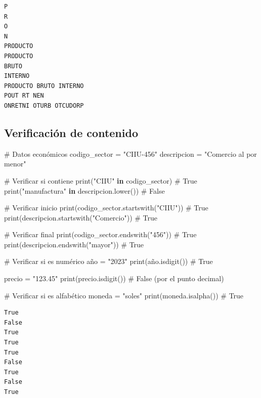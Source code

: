 \documentclass[
  doc,
  floatsintext,
  longtable,
  a4paper,
  nolmodern,
  notxfonts,
  notimes,
  12pt,
  colorlinks=true,linkcolor=blue,citecolor=blue,urlcolor=blue]{apa7}
\newenvironment{Shaded}{\begin{snugshade}}{\end{snugshade}}
\newcommand{\BuiltInTok}[1]{\textcolor[rgb]{0.00,0.23,0.31}{#1}}
\newcommand{\CommentTok}[1]{\textcolor[rgb]{0.37,0.37,0.37}{#1}}
\newcommand{\KeywordTok}[1]{\textcolor[rgb]{0.00,0.23,0.31}{\textbf{#1}}}
\newcommand{\NormalTok}[1]{\textcolor[rgb]{0.00,0.23,0.31}{#1}}
\newcommand{\OperatorTok}[1]{\textcolor[rgb]{0.37,0.37,0.37}{#1}}
\newcommand{\StringTok}[1]{\textcolor[rgb]{0.13,0.47,0.30}{#1}}
\begin{document}
\begin{verbatim}
P
R
O
N
PRODUCTO
PRODUCTO
BRUTO
INTERNO
PRODUCTO BRUTO INTERNO
POUT RT NEN
ONRETNI OTURB OTCUDORP
\end{verbatim}

\subsection{Verificación de
contenido}\label{verificaciuxf3n-de-contenido}

\begin{Shaded}
\begin{Highlighting}[]
\CommentTok{\# Datos económicos}
\NormalTok{codigo\_sector }\OperatorTok{=} \StringTok{"CIIU{-}456"}
\NormalTok{descripcion }\OperatorTok{=} \StringTok{"Comercio al por menor"}

\CommentTok{\# Verificar si contiene}
\BuiltInTok{print}\NormalTok{(}\StringTok{"CIIU"} \KeywordTok{in}\NormalTok{ codigo\_sector)  }\CommentTok{\# True}
\BuiltInTok{print}\NormalTok{(}\StringTok{"manufactura"} \KeywordTok{in}\NormalTok{ descripcion.lower())  }\CommentTok{\# False}

\CommentTok{\# Verificar inicio}
\BuiltInTok{print}\NormalTok{(codigo\_sector.startswith(}\StringTok{"CIIU"}\NormalTok{))  }\CommentTok{\# True}
\BuiltInTok{print}\NormalTok{(descripcion.startswith(}\StringTok{"Comercio"}\NormalTok{))  }\CommentTok{\# True}

\CommentTok{\# Verificar final}
\BuiltInTok{print}\NormalTok{(codigo\_sector.endswith(}\StringTok{"456"}\NormalTok{))  }\CommentTok{\# True}
\BuiltInTok{print}\NormalTok{(descripcion.endswith(}\StringTok{"mayor"}\NormalTok{))  }\CommentTok{\# True}

\CommentTok{\# Verificar si es numérico}
\NormalTok{año }\OperatorTok{=} \StringTok{"2023"}
\BuiltInTok{print}\NormalTok{(año.isdigit())  }\CommentTok{\# True}

\NormalTok{precio }\OperatorTok{=} \StringTok{"123.45"}
\BuiltInTok{print}\NormalTok{(precio.isdigit())  }\CommentTok{\# False (por el punto decimal)}

\CommentTok{\# Verificar si es alfabético}
\NormalTok{moneda }\OperatorTok{=} \StringTok{"soles"}
\BuiltInTok{print}\NormalTok{(moneda.isalpha())  }\CommentTok{\# True}
\end{Highlighting}
\end{Shaded}

\begin{verbatim}
True
False
True
True
True
False
True
False
True
\end{verbatim}
\end{document}
